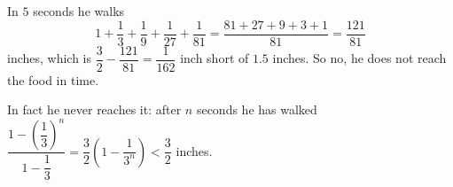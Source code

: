 In $5$ seconds he walks
\[1+\dfrac13+\dfrac19+\dfrac1{27}+\dfrac1{81}=\dfrac{81+27+9+3+1}{81}=\dfrac{121}{81}\]
inches, which is $\dfrac{3}{2}-\dfrac{121}{81}=\dfrac{1}{162}$ inch short of $1.5$ inches. So $\boxed{\text{no}}$, he does not reach the food in time.

In fact he never reaches it: after $n$ seconds he has walked $\dfrac{1-\left(\dfrac13\right)^n}{1-\dfrac13}=\dfrac32\left(1-\dfrac{1}{3^n}\right)<\dfrac32$ inches.
